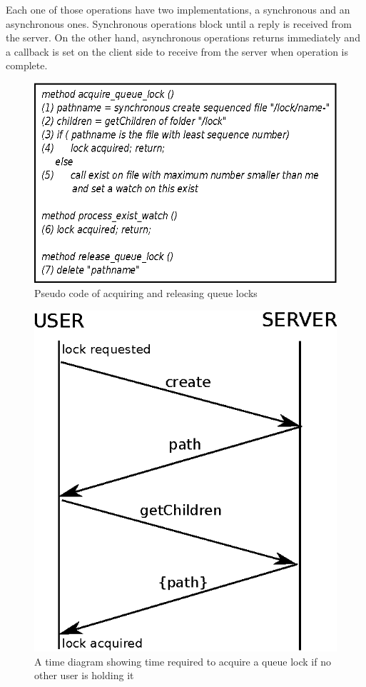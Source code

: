 Each one of those operations have two implementations, a synchronous and an asynchronous ones. Synchronous operations block until a reply is received from the server. On the other hand, asynchronous operations returns immediately and a callback is set on the client side to receive from the server when operation is complete.

\begin{figure}[h]
\centering
\includegraphics[scale=0.85]{img/queue_lock_pseudo.eps}
\caption{Pseudo code of acquiring and releasing queue locks}
\label{fig:queue_lock_pseudo}
\end{figure}

\begin{figure}[h]
\centering
\includegraphics[scale=0.85]{img/queue_lock_time.eps}
\caption{A time diagram showing time required to acquire a queue lock if no other user is holding it}
\label{fig:queue_lock_time}
\end{figure}

